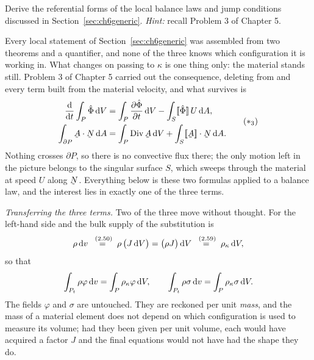 \begin{problem}
Derive the referential forms of the local balance laws and jump
conditions discussed in Section~\ref{sec:ch6generic}. \emph{Hint:}
recall Problem 3 of Chapter 5.
\end{problem}

\begin{solution}
Every local statement of Section~\ref{sec:ch6generic} was assembled from
two theorems and a quantifier, and none of the three knows which
configuration it is working in. What changes on passing to $\kappa$ is
one thing only: the material stands still. Problem 3 of Chapter 5
carried out the consequence, deleting from  and 
every term built from the material velocity, and what survives is
\begin{equation}
\begin{aligned}
   \frac{\dl}{\dl t}\int_{P}\hat\Phi\,\dl V
   &=\int_{P}\frac{\partial\hat\Phi}{\partial t}\,\dl V
   -\int_{S}\jump{\hat\Phi}\,U\,\dl A ,\\
   \int_{\partial P}\ip\bA\bN\,\dl A
   &=\int_{P}\Dvg\bA\,\dl V+\int_{S}\ip{\jump\bA}\bN\,\dl A .
\end{aligned}
   \tag{$\ast_{3}$}\label{eq:ch6refthms}
\end{equation}
Nothing crosses $\partial P$, so there is no convective flux there; the
only motion left in the picture belongs to the singular surface $S$,
which sweeps through the material at speed $U$ along $\bN$. Everything
below is these two formulas applied to a balance law, and the interest
lies in exactly one of the three terms.

\medskip
\noindent\emph{Transferring the three terms.}
Two of the three move without thought. For the left-hand side and the
bulk supply of  the substitution is
\[
   \rho\,\dl v
   \overset{\eqr{2.50}}{=}\rho\,\big(J\,\dl V\big)
   =\big(\rho J\big)\,\dl V
   \overset{\eqr{2.59}}{=}\rho_{\kappa}\,\dl V ,
\]
so that
\[
   \int_{P_{t}}\rho\varphi\,\mathrm{d} v=\int_{P}\rho_{\kappa}\varphi\,\mathrm{d} V ,
   \qquad
   \int_{P_{t}}\rho\sigma\,\mathrm{d} v=\int_{P}\rho_{\kappa}\sigma\,\mathrm{d} V .
\]
The fields $\varphi$ and $\sigma$ are untouched. They are reckoned per
unit \emph{mass}, and the mass of a material element does not depend on
which configuration is used to measure its volume; had they been given
per unit volume, each would have acquired a factor $J$ and the final
equations would not have had the shape they do.


\end{solution}
